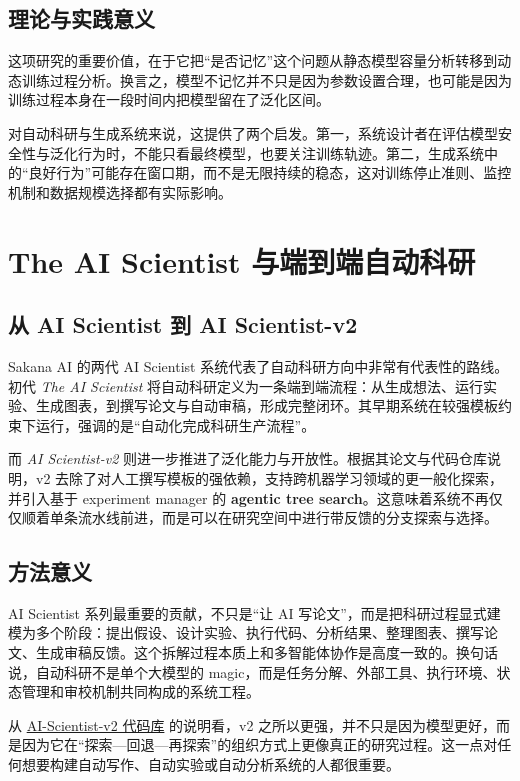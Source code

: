 \documentclass[UTF8,11pt]{ctexart}
\begin{document}
\subsection{理论与实践意义}
这项研究的重要价值，在于它把“是否记忆”这个问题从静态模型容量分析转移到动态训练过程分析。换言之，模型不记忆并不只是因为参数设置合理，也可能是因为训练过程本身在一段时间内把模型留在了泛化区间。

对自动科研与生成系统来说，这提供了两个启发。第一，系统设计者在评估模型安全性与泛化行为时，不能只看最终模型，也要关注训练轨迹。第二，生成系统中的“良好行为”可能存在窗口期，而不是无限持续的稳态，这对训练停止准则、监控机制和数据规模选择都有实际影响。

\section{The AI Scientist 与端到端自动科研}
\subsection{从 AI Scientist 到 AI Scientist-v2}
Sakana AI 的两代 AI Scientist 系统代表了自动科研方向中非常有代表性的路线。初代 \emph{The AI Scientist} 将自动科研定义为一条端到端流程：从生成想法、运行实验、生成图表，到撰写论文与自动审稿，形成完整闭环。其早期系统在较强模板约束下运行，强调的是“自动化完成科研生产流程”。

而 \emph{AI Scientist-v2} 则进一步推进了泛化能力与开放性。根据其论文与代码仓库说明，v2 去除了对人工撰写模板的强依赖，支持跨机器学习领域的更一般化探索，并引入基于 experiment manager 的 \textbf{agentic tree search}。这意味着系统不再仅仅顺着单条流水线前进，而是可以在研究空间中进行带反馈的分支探索与选择。

\subsection{方法意义}
AI Scientist 系列最重要的贡献，不只是“让 AI 写论文”，而是把科研过程显式建模为多个阶段：提出假设、设计实验、执行代码、分析结果、整理图表、撰写论文、生成审稿反馈。这个拆解过程本质上和多智能体协作是高度一致的。换句话说，自动科研不是单个大模型的 magic，而是任务分解、外部工具、执行环境、状态管理和审校机制共同构成的系统工程。

从 \href{https://github.com/SakanaAI/AI-Scientist-v2}{AI-Scientist-v2 代码库} 的说明看，v2 之所以更强，并不只是因为模型更好，而是因为它在“探索---回退---再探索”的组织方式上更像真正的研究过程。这一点对任何想要构建自动写作、自动实验或自动分析系统的人都很重要。
\end{document}

